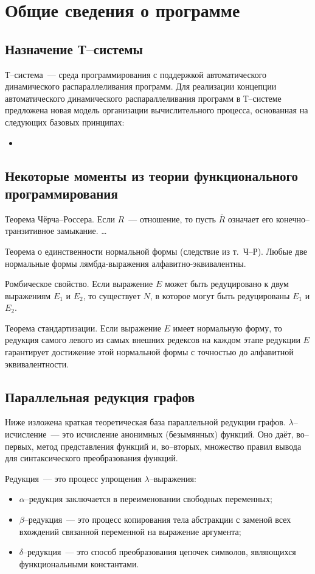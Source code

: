 \section{Общие сведения о программе}

\subsection{Назначение Т--системы}
Т--система~---  среда программирования с поддержкой автоматического динамического
распараллеливания программ. Для реализации концепции автоматического динамического
распараллеливания программ в Т--системе предложена новая модель организации
вычислительного процесса, основанная на следующих базовых принципах:
\begin{itemize}
\item
\end{itemize}

\subsection{Некоторые моменты из теории функционального программирования}
Теорема Чёрча--Россера.
Если $R$~--- отношение, то пусть $\bar{R}$ означает его конечно--транзитивное замыкание.
\dots

Теорема о единственности нормальной формы (следствие из т.~Ч--Р).
Любые две нормальные формы лямбда-выражения алфавитно-эквивалентны.

Ромбическое свойство.
Если выражение $E$ может быть редуцировано к двум выражениям $E_1$ и $E_2$, то существует
$N$, в которое могут быть редуцированы $E_1$ и $E_2$.

Теорема стандартизации.
Если выражение $E$ имеет нормальную форму,
то редукция самого левого из самых внешних редексов на каждом
этапе редукции $E$ гарантирует достижение этой нормальной
формы с точностью до алфавитной эквивалентности.

\subsection{Параллельная редукция графов}
Ниже изложена краткая теоретическая база параллельной редукции графов.
$\lambda$--исчисление~--- это исчисление анонимных (безымянных) функций.
Оно даёт, во--первых, метод представления функций и,
во--вторых, множество правил вывода для синтаксического преобразования функций.

Редукция~--- это процесс упрощения $\lambda$--выражения:
\begin{itemize}
\item $\alpha$--редукция заключается в переименовании свободных переменных;
\item $\beta$--редукция~---  это процесс копирования тела абстракции
с заменой всех вхождений связанной переменной на выражение аргумента;
\item $\delta$--редукция~---  это способ преобразования цепочек символов,
являющихся функциональными константами.
\end{itemize}

